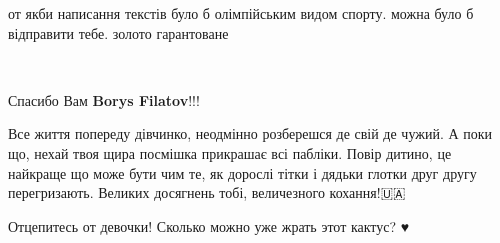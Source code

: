 \begin{itemize}
\begin{itemize}
\end{itemize}

 

от якби написання текстів було б олімпійським видом спорту. можна було б
відправити тебе. золото гарантоване

 

👏👏👏✅

 
Спасибо Вам \textbf{Borys Filatov}!!!

 

Все життя попереду дівчинко, неодмінно розберешся де свій де чужий. А поки що,
нехай твоя щира посмішка прикрашає всі пабліки. Повір дитино, це найкраще що
може бути чим те, як дорослі тітки і дядьки глотки друг другу перегризають.
Великих досягнень тобі, величезного кохання!🇺🇦

 

Отцепитесь от девочки! Сколько можно уже жрать этот кактус? ♥️

 

\end{itemize}

